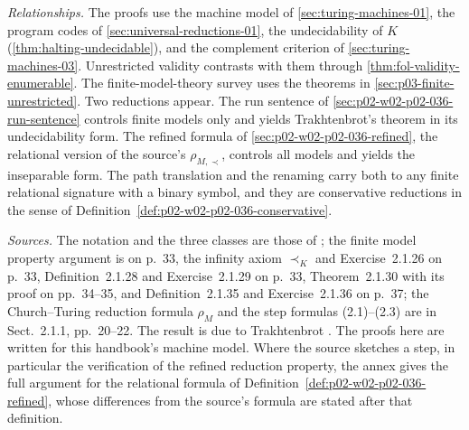 \emph{Relationships.}  The proofs use the machine model of
\cref{sec:turing-machines-01}, the program codes of
\cref{sec:universal-reductions-01}, the undecidability of \(K\)
(\cref{thm:halting-undecidable}), and the complement criterion of
\cref{sec:turing-machines-03}.  Unrestricted validity contrasts with them
through \cref{thm:fol-validity-enumerable}.  The finite-model-theory survey
uses the theorems in \cref{sec:p03-finite-unrestricted}.  Two reductions
appear.  The run sentence of \cref{sec:p02-w02-p02-036-run-sentence} controls
finite models only and yields Trakhtenbrot's theorem in its undecidability
form.  The refined formula of \cref{sec:p02-w02-p02-036-refined}, the
relational version of the source's \(\rho_{M,\prec}\), controls all models and
yields the inseparable form.  The path translation and the renaming carry both
to any finite relational signature with a binary symbol, and they are
conservative reductions in the sense of
Definition~\ref{def:p02-w02-p02-036-conservative}.

\emph{Sources.}  The notation and the three classes are those of
\cite[Sect.~2.1.2, Def.~2.1.27]{BorgerGradelGurevich1997}; the finite model
property argument is on p.~33, the infinity axiom \(\prec_K\) and
Exercise~2.1.26 on p.~33, Definition~2.1.28 and Exercise~2.1.29 on p.~33,
Theorem~2.1.30 with its proof on pp.~34--35, and Definition~2.1.35 and
Exercise~2.1.36 on p.~37; the Church--Turing reduction formula \(\rho_M\) and
the step formulas (2.1)--(2.3) are in Sect.~2.1.1, pp.~20--22.  The result is
due to Trakhtenbrot \cite{Trakhtenbrot1950}.  The proofs here are written for
this handbook's machine model.  Where the source sketches a step, in
particular the verification of the refined reduction property, the annex gives
the full argument for the relational formula of
Definition~\ref{def:p02-w02-p02-036-refined}, whose differences from the
source's formula are stated after that definition.
